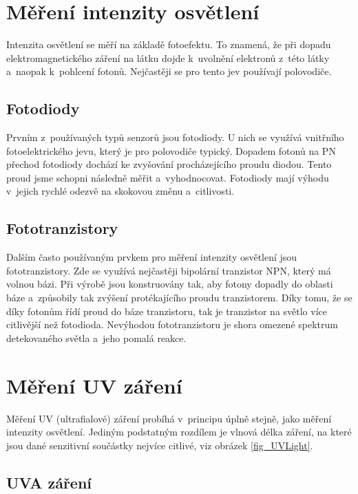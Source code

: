 \section{Měření intenzity osvětlení}

Intenzita osvětlení se měří na základě fotoefektu. To znamená, že při dopadu elektromagnetického záření na látku dojde k~uvolnění elektronů z~této látky a~naopak k~pohlcení fotonů. Nejčastěji se pro tento jev používají polovodiče.

\subsection{Fotodiody}

Prvním z~používaných typů senzorů jsou fotodiody. U nich se využívá vnitřního fotoelektrického jevu, který je pro polovodiče typický. Dopadem fotonů na PN přechod fotodiody dochází ke zvyšování procházejícího proudu diodou. Tento proud jsme schopni následně měřit a~vyhodnocovat. Fotodiody mají výhodu v~jejich rychlé odezvě na skokovou změnu a~citlivosti.

\subsection{Fototranzistory}

Dalším často používaným prvkem pro měření intenzity osvětlení jsou fototranzistory. Zde se využívá nejčastěji bipolární tranzistor NPN, který má volnou bázi. Při výrobě jsou konstruovány tak, aby fotony dopadly do oblasti báze a~způsobily tak zvýšení protékajícího proudu tranzistorem. Díky tomu, že se díky fotonům řídí proud do báze tranzistoru, tak je tranzistor na světlo více citlivější než fotodioda. Nevýhodou fototranzistoru je shora omezené spektrum detekovaného světla a~jeho pomalá reakce. 

\section{Měření UV záření}

Měření UV (ultrafialové) záření probíhá v~principu úplně stejně, jako měření intenzity osvětlení. Jediným podstatným rozdílem je vlnová délka záření, na které jsou dané senzitivní součástky nejvíce citlivé, viz obrázek \ref{fig_UVLight}.

\subsection{UVA záření}

